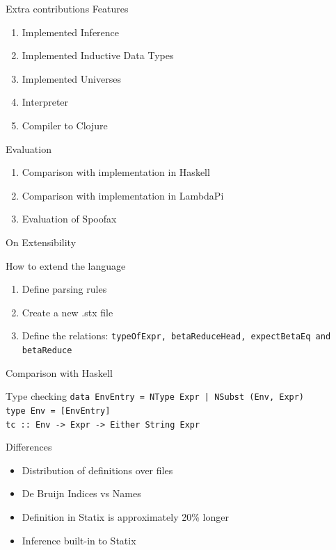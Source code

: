\documentclass[aspectratio=43]{beamer}
\begin{document}
\begin{frame}[fragile]{Extra contributions}
Features
\begin{enumerate}
	\item Implemented Inference
	\item Implemented Inductive Data Types
	\item Implemented Universes
	\item Interpreter
	\item Compiler to Clojure
\end{enumerate}
Evaluation
\begin{enumerate}
	\item Comparison with implementation in Haskell
	\item Comparison with implementation in LambdaPi
	\item Evaluation of Spoofax
\end{enumerate}
\end{frame}

\begin{frame}{On Extensibility}
	\begin{block}{How to extend the language}
		\begin{enumerate}
			\item Define parsing rules
			\item Create a new .stx file
			\item Define the relations: \texttt{typeOfExpr, betaReduceHead, expectBetaEq and betaReduce}
		\end{enumerate}
	\end{block}
\end{frame}

\begin{frame}{Comparison with Haskell}
	\begin{block}{Type checking}
		\texttt{data EnvEntry = NType Expr | NSubst (Env, Expr)
			\\type Env = [EnvEntry]
			\\tc :: Env -> Expr -> Either String Expr}
	\end{block}

	\begin{block}{Differences}
		\begin{itemize}
			\item Distribution of definitions over files
			\item De Bruijn Indices vs Names
			\item Definition in Statix is approximately 20\% longer
			\item Inference built-in to Statix
		\end{itemize}
	\end{block}
\end{frame}
\end{document}
